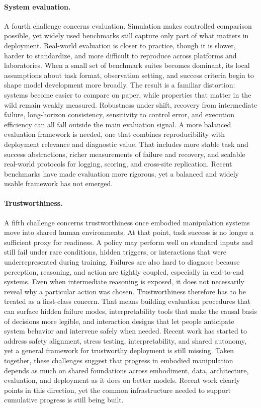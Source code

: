 \documentclass[acmsmall,screen,review,anonymous]{acmart}
\begin{document}
\paragraph{System evaluation.}\label{sec:challenge_evaluation}
A fourth challenge concerns evaluation. Simulation makes controlled comparison possible, yet widely used benchmarks still capture only part of what matters in deployment. Real-world evaluation is closer to practice, though it is slower, harder to standardize, and more difficult to reproduce across platforms and laboratories. When a small set of benchmark suites becomes dominant, its local assumptions about task format, observation setting, and success criteria begin to shape model development more broadly. The result is a familiar distortion: systems become easier to compare on paper, while properties that matter in the wild remain weakly measured. Robustness under shift, recovery from intermediate failure, long-horizon consistency, sensitivity to control error, and execution efficiency can all fall outside the main evaluation signal. A more balanced evaluation framework is needed, one that combines reproducibility with deployment relevance and diagnostic value. That includes more stable task and success abstractions, richer measurements of failure and recovery, and scalable real-world protocols for logging, scoring, and cross-site replication. Recent benchmarks have made evaluation more rigorous, yet a balanced and widely usable framework has not emerged.
\paragraph{Trustworthiness.}\label{sec:challenge_safety}
A fifth challenge concerns trustworthiness once embodied manipulation systems move into shared human environments. At that point, task success is no longer a sufficient proxy for readiness. A policy may perform well on standard inputs and still fail under rare conditions, hidden triggers, or interactions that were underrepresented during training. Failures are also hard to diagnose because perception, reasoning, and action are tightly coupled, especially in end-to-end systems. Even when intermediate reasoning is exposed, it does not necessarily reveal why a particular action was chosen. Trustworthiness therefore has to be treated as a first-class concern. That means building evaluation procedures that can surface hidden failure modes, interpretability tools that make the causal basis of decisions more legible, and interaction designs that let people anticipate system behavior and intervene safely when needed. Recent work has started to address safety alignment, stress testing, interpretability, and shared autonomy, yet a general framework for trustworthy deployment is still missing.
Taken together, these challenges suggest that progress in embodied manipulation depends as much on shared foundations across embodiment, data, architecture, evaluation, and deployment as it does on better models. Recent work clearly points in this direction, yet the common infrastructure needed to support cumulative progress is still being built.
\end{document}
